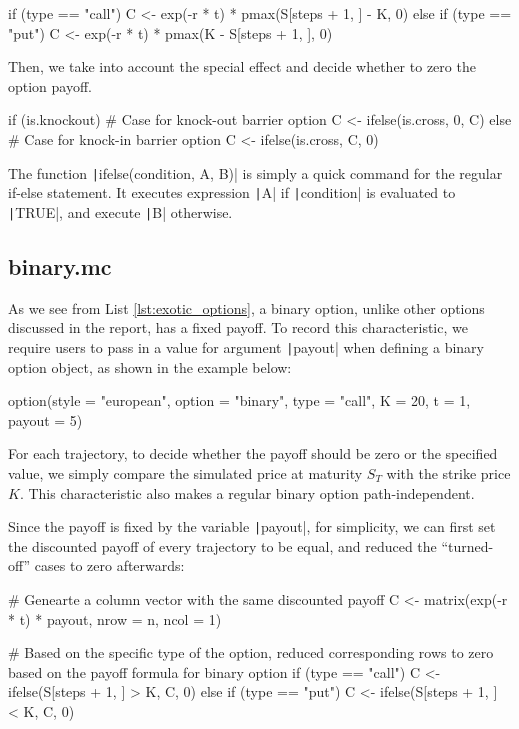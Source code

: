 \begin{Rminted}
if (type == "call") {
    C <- exp(-r * t) * pmax(S[steps + 1, ] - K, 0)
} else if (type == "put") {
    C <- exp(-r * t) * pmax(K - S[steps + 1, ], 0)
}
\end{Rminted}

Then, we take into account the special effect and decide whether to zero the option payoff.

\begin{Rminted}
if (is.knockout) { # Case for knock-out barrier option
    C <- ifelse(is.cross, 0, C)
} else { # Case for knock-in barrier option
    C <- ifelse(is.cross, C, 0)
}
\end{Rminted}

The function \texttt|ifelse(condition, A, B)| is simply a quick command for the regular if-else statement. It executes expression \texttt|A| if \texttt|condition| is evaluated to \texttt|TRUE|, and execute \texttt|B| otherwise.

\subsection{binary.mc}

As we see from List \ref{lst:exotic_options}, a binary option, unlike other options discussed in the report, has a fixed payoff. To record this characteristic, we require users to pass in a value for argument \texttt|payout| when defining a binary option object, as shown in the example below:

\begin{Rminted}
option(style = "european", option = "binary", type = "call", K = 20, t = 1, payout = 5)
\end{Rminted}

For each trajectory, to decide whether the payoff should be zero or the specified value, we simply compare the simulated price at maturity $S_T$ with the strike price $K$. This characteristic also makes a regular binary option path-independent.

Since the payoff is fixed by the variable \texttt|payout|, for simplicity, we can first set the discounted payoff of every trajectory to be equal, and reduced the ``turned-off'' cases to zero afterwards:

\begin{Rminted}
# Genearte a column vector with the same discounted payoff
C <- matrix(exp(-r * t) * payout, nrow = n, ncol = 1)

# Based on the specific type of the option, reduced corresponding rows to zero based on the payoff formula for binary option
if (type == "call") {
    C <- ifelse(S[steps + 1, ] > K, C, 0)
} else if (type == "put") {
    C <- ifelse(S[steps + 1, ] < K, C, 0)
}
\end{Rminted}

